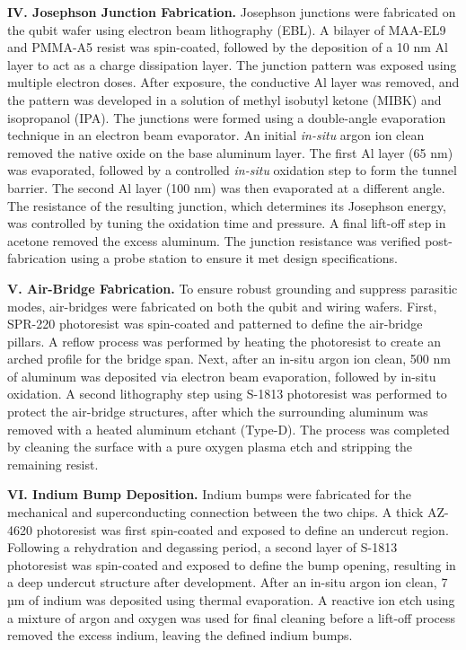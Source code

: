 \documentclass[reprint,superscriptaddress,preprintnumbers,longbibliography,
amsmath,amssymb,aps,floatfix,pra,twocolumn, tightenlines %
]{revtex4-2}
\begin{document}
    \textbf{IV. Josephson Junction Fabrication.}
    Josephson junctions were fabricated on the qubit wafer using electron beam lithography (EBL). A bilayer of MAA-EL9 and PMMA-A5 resist was spin-coated, followed by the deposition of a 10 nm Al layer to act as a charge dissipation layer. The junction pattern was exposed using multiple electron doses. After exposure, the conductive Al layer was removed, and the pattern was developed in a solution of methyl isobutyl ketone (MIBK) and isopropanol (IPA).
    The junctions were formed using a double-angle evaporation technique in an electron beam evaporator. An initial \textit{in-situ} argon ion clean removed the native oxide on the base aluminum layer. The first Al layer (65 nm) was evaporated, followed by a controlled \textit{in-situ} oxidation step to form the tunnel barrier. The second Al layer (100 nm) was then evaporated at a different angle. The resistance of the resulting junction, which determines its Josephson energy, was controlled by tuning the oxidation time and pressure. A final lift-off step in acetone removed the excess aluminum. The junction resistance was verified post-fabrication using a probe station to ensure it met design specifications.
  
    \textbf{V. Air-Bridge Fabrication.}
    To ensure robust grounding and suppress parasitic modes, air-bridges were fabricated on both the qubit and wiring wafers. First, SPR-220 photoresist was spin-coated and patterned to define the air-bridge pillars. A reflow process was performed by heating the photoresist to create an arched profile for the bridge span. Next, after an in-situ argon ion clean, 500 nm of aluminum was deposited via electron beam evaporation, followed by in-situ oxidation. A second lithography step using S-1813 photoresist was performed to protect the air-bridge structures, after which the surrounding aluminum was removed with a heated aluminum etchant (Type-D). The process was completed by cleaning the surface with a pure oxygen plasma etch and stripping the remaining resist.
  
    \textbf{VI. Indium Bump Deposition.}
    Indium bumps were fabricated for the mechanical and superconducting connection between the two chips. A thick AZ-4620 photoresist was first spin-coated and exposed to define an undercut region. Following a rehydration and degassing period, a second layer of S-1813 photoresist was spin-coated and exposed to define the bump opening, resulting in a deep undercut structure after development. After an in-situ argon ion clean, 7 µm of indium was deposited using thermal evaporation. A reactive ion etch using a mixture of argon and oxygen was used for final cleaning before a lift-off process removed the excess indium, leaving the defined indium bumps.
  
\end{document}
